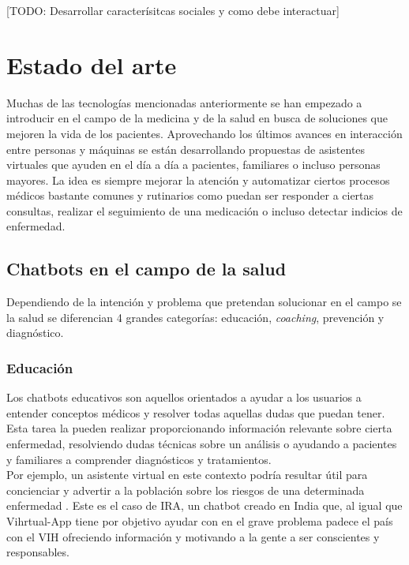 [TODO: Desarrollar caracterísitcas sociales y como debe interactuar]


\section{Estado del arte}
Muchas de las tecnologías mencionadas anteriormente se han empezado a introducir en el campo de la medicina y de la salud en busca de soluciones que mejoren la vida de los pacientes. Aprovechando los últimos avances en interacción entre personas y máquinas  se están desarrollando propuestas de asistentes virtuales que ayuden en el día a día a pacientes, familiares o incluso personas mayores. La idea es siempre mejorar la atención y automatizar ciertos procesos médicos \cite{healthAgents} bastante comunes y rutinarios como puedan ser responder a ciertas consultas, realizar el seguimiento de una medicación o incluso detectar indicios de enfermedad. \\

\subsection{Chatbots en el campo de la salud}
Dependiendo de la intención y problema que pretendan solucionar en el campo se la salud se diferencian 4 grandes categorías: educación, \textit{coaching}, prevención y diagnóstico.\\

\subsubsection{Educación}
Los chatbots educativos son aquellos orientados a ayudar a los usuarios a entender conceptos médicos y resolver todas aquellas dudas que puedan tener. Esta tarea la pueden realizar proporcionando información relevante sobre cierta enfermedad, resolviendo dudas técnicas sobre un análisis o ayudando a pacientes y familiares a comprender diagnósticos y tratamientos. \\

Por ejemplo, un asistente virtual en este contexto podría resultar útil para  concienciar y advertir a la población sobre los riesgos de una determinada enfermedad . Este es el caso de IRA, un chatbot creado en India que, al igual que Vihrtual-App tiene por objetivo ayudar con en el grave problema padece el país con el VIH ofreciendo información y motivando a la gente a ser conscientes y responsables.\\

